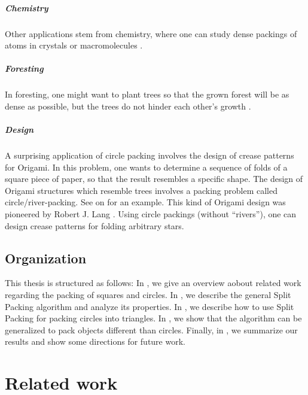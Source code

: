 \documentclass[a4paper,style=print,oneside,bibliography=totoc,nexus,lnum,extramargin]{tubsbook}
\begin{document}
\paragraph{Chemistry}

Other applications stem from chemistry, where one can study dense packings of atoms in crystals or macromolecules \cite{WMP1994history}.

\paragraph{Foresting}

In foresting, one might want to plant trees so that the grown forest will be as dense as possible, but the trees do not hinder each other's growth \cite{SMCSCG2007new}.

\paragraph{Design}

A surprising application of circle packing involves the design of crease patterns for Origami. In this problem, one wants to determine a sequence of folds of a square piece of paper, so that the result resembles a specific shape. The design of Origami structures which resemble trees involves a packing problem called circle/river-packing. See  on  for an example. This kind of Origami design was pioneered by Robert J. Lang \cite{lang1996computational}. Using circle packings (without “rivers”), one can design crease patterns for folding arbitrary stars.

\section{Organization}

This thesis is structured as follows:
In \textbf{}, we give an overview aobout related work regarding the packing of squares and circles.
In \textbf{}, we describe the general Split Packing algorithm and analyze its properties.
In \textbf{}, we describe how to use Split Packing for packing circles into triangles.
In \textbf{}, we show that the algorithm can be generalized to pack objects different than circles.
Finally, in \textbf{}, we summarize our results and show some directions for future work.

\chapter{Related work}\label{ch:related-work}
\end{document}
